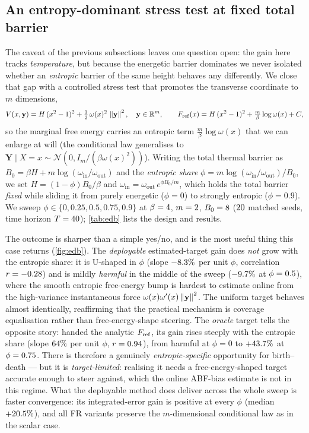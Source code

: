 \subsection{An entropy-dominant stress test at fixed total barrier}
\label{sec:eb_entropy_dominant}
The caveat of the previous subsections leaves one question open: the gain here
tracks \emph{temperature}, but because the energetic barrier dominates we never
isolated whether an \emph{entropic} barrier of the same height behaves any
differently. We close that gap with a controlled stress test that promotes the
transverse coordinate to $m$ dimensions,
\begin{equation}
  V(x,\mathbf y) = H\,(x^2-1)^2 + \tfrac12\,\omega(x)^2\,\left\lVert \mathbf y \right\rVert^2,
  \quad \mathbf y\in\mathbb{R}^m,\qquad
  F_{\mathrm{ref}}(x) = H\,(x^2-1)^2 + \tfrac{m}{\beta}\log\omega(x) + C,
  \label{eq:edb_potential}
\end{equation}
so the marginal free energy carries an entropic term
$\tfrac{m}{\beta}\log\omega(x)$ that we can enlarge at will (the conditional law
generalises to $\mathbf Y\mid X=x\sim\mathcal N(0,I_m/(\beta\omega(x)^2))$).
Writing the total thermal barrier as
$B_0=\beta H + m\log(\omega_{\mathrm{in}}/\omega_{\mathrm{out}})$ and the
\emph{entropic share}
$\phi=m\log(\omega_{\mathrm{in}}/\omega_{\mathrm{out}})/B_0$, we set
$H=(1-\phi)B_0/\beta$ and
$\omega_{\mathrm{in}}=\omega_{\mathrm{out}}\,e^{\phi B_0/m}$, which holds the total
barrier \emph{fixed} while sliding it from purely energetic ($\phi=0$) to strongly
entropic ($\phi=0.9$). We sweep $\phi\in\{0,0.25,0.5,0.75,0.9\}$ at
$\beta=4$, $m=2$, $B_0=8$ ($20$ matched seeds, time
horizon $T=40$); \cref{tab:edb} lists the design and results.



The outcome is sharper than a simple yes/no, and is the most useful thing this
case returns (\cref{fig:edb}). The \emph{deployable} estimated-target gain does
\emph{not} grow with the entropic share: it is U-shaped in $\phi$ (slope
$-8.3\%$ per unit $\phi$, correlation $r=-0.28$) and is mildly
\emph{harmful} in the middle of the sweep ($-9.7\%$ at $\phi=0.5$),
where the smooth entropic free-energy bump is hardest to estimate online from the
high-variance instantaneous force $\omega(x)\omega'(x)\left\lVert \mathbf y \right\rVert^2$. The
uniform target behaves almost identically, reaffirming that the practical
mechanism is coverage equalisation rather than free-energy-shape steering. The
\emph{oracle} target tells the opposite story: handed the analytic $F_{\mathrm{ref}}$, its
gain rises steeply with the entropic share (slope $64\%$ per unit
$\phi$, $r=0.94$), from harmful at $\phi=0$ to $+43.7\%$ at
$\phi=0.75$. There is therefore a genuinely \emph{entropic-specific}
opportunity for birth--death --- but it is \emph{target-limited}: realising it
needs a free-energy-shaped target accurate enough to steer against, which the
online ABF-bias estimate is not in this regime. What the deployable method does
deliver across the whole sweep is faster convergence: its integrated-error gain is
positive at every $\phi$ (median $+20.5\%$), and all FR variants preserve
the $m$-dimensional conditional law as in the scalar case.

